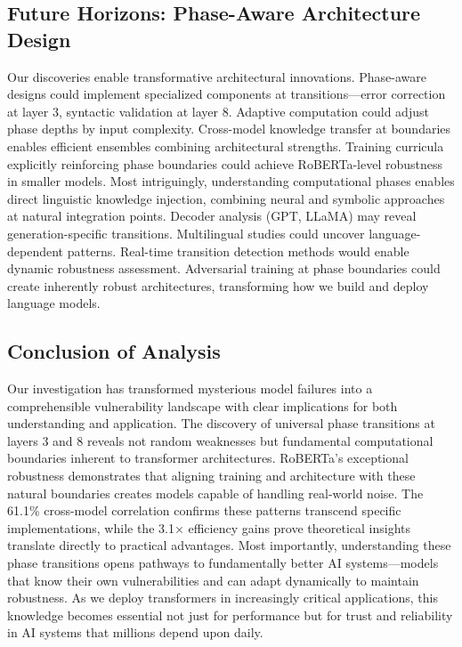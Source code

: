 \subsection{Future Horizons: Phase-Aware Architecture Design}

Our discoveries enable transformative architectural innovations. Phase-aware designs could implement specialized components at transitions---error correction at layer 3, syntactic validation at layer 8. Adaptive computation could adjust phase depths by input complexity. Cross-model knowledge transfer at boundaries enables efficient ensembles combining architectural strengths. Training curricula explicitly reinforcing phase boundaries could achieve RoBERTa-level robustness in smaller models. Most intriguingly, understanding computational phases enables direct linguistic knowledge injection, combining neural and symbolic approaches at natural integration points. Decoder analysis (GPT, LLaMA) may reveal generation-specific transitions. Multilingual studies could uncover language-dependent patterns. Real-time transition detection methods would enable dynamic robustness assessment. Adversarial training at phase boundaries could create inherently robust architectures, transforming how we build and deploy language models.

\subsection{Conclusion of Analysis}

Our investigation has transformed mysterious model failures into a comprehensible vulnerability landscape with clear implications for both understanding and application. The discovery of universal phase transitions at layers 3 and 8 reveals not random weaknesses but fundamental computational boundaries inherent to transformer architectures. RoBERTa's exceptional robustness demonstrates that aligning training and architecture with these natural boundaries creates models capable of handling real-world noise. The 61.1\% cross-model correlation confirms these patterns transcend specific implementations, while the 3.1× efficiency gains prove theoretical insights translate directly to practical advantages. Most importantly, understanding these phase transitions opens pathways to fundamentally better AI systems---models that know their own vulnerabilities and can adapt dynamically to maintain robustness. As we deploy transformers in increasingly critical applications, this knowledge becomes essential not just for performance but for trust and reliability in AI systems that millions depend upon daily.